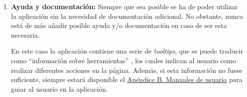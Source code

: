 \begin{enumerate}
    
    \item {\bf Ayuda y documentación:} Siempre que sea posible se ha de poder utilizar la aplicación sin la necesidad de documentación adicional. No obstante, nunca está de más añadir posible ayuda y/o documentación en caso de ser esta necesaria.
    
    En este caso la aplicación contiene una serie de {\it tooltips}, que se puede traducir como ``información sobre herramientas'' \cite{infoherramientas}, los cuales indican al usuario como realizar diferentes acciones en la página. Además, si esta información no fuese suficiente, siempre estará disponible el \hyperref[enlacemanualusuario]{Apéndice B. Manuales de usuario} para guiar al usuario en la aplicación.
\end{enumerate}